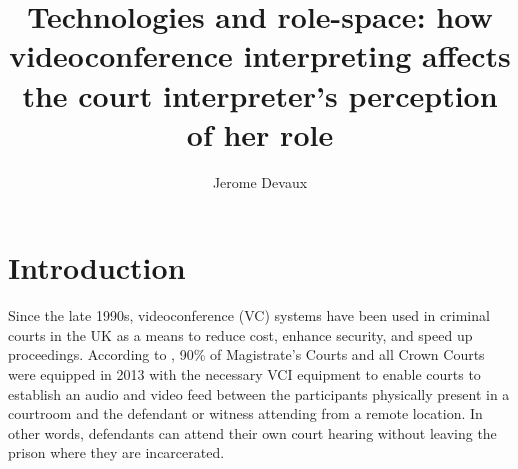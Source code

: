 \documentclass[output=paper]{langsci/langscibook}
\author{Jerome Devaux\affiliation{affiliation}}
\title{Technologies and role-space: how videoconference interpreting affects the court interpreter’s perception of her role}
\begin{document}

 

 

 

 

 

 

 

 

 

 

 

\section{Introduction}
Since the late 1990s, videoconference (\textsc{VC}) systems have been used in criminal courts in the UK \citep{Plotnikoff1999, Plotnikoff2000} as a means to reduce cost, enhance security, and speed up proceedings. According to \citep{Braun2016b}, 90\% of Magistrate’s Courts and all Crown Courts were equipped in 2013 with the necessary \textsc{VCI} equipment to enable courts to establish an audio and video feed between the participants physically present in a courtroom and the defendant or witness attending from a remote location. In other words, defendants can attend their own court hearing without leaving the prison where they are incarcerated. 
\end{document}
